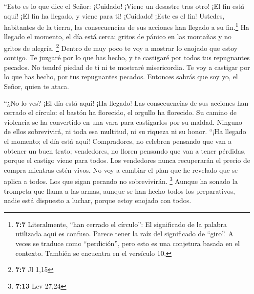  ``Esto es lo que dice el Señor: ¡Cuidado! ¡Viene un
desastre tras otro!  ¡El fin está aquí! ¡El fin ha
llegado, y viene para ti! ¡Cuidado! ¡Este es el fin! 
Ustedes, habitantes de la tierra, las consecuencias de sus acciones han
llegado a su fin.\footnote{\textbf{7:7} Literalmente, ``han cerrado el
  círculo'': El significado de la palabra utilizada aquí es confuso.
  Parece tener la raíz del significado de ``giro''. A veces se traduce
  como ``perdición'', pero esto es una conjetura basada en el contexto.
  También se encuentra en el versículo 10.} Ha llegado el momento, el
día está cerca: gritos de pánico en las montañas y no gritos de alegría.
\footnote{\textbf{7:7} Jl 1,15}  Dentro de muy poco te voy
a mostrar lo enojado que estoy contigo. Te juzgaré por lo que has hecho,
y te castigaré por todos tus repugnantes pecados.  No
tendré piedad de ti ni te mostraré misericordia. Te voy a castigar por
lo que has hecho, por tus repugnantes pecados. Entonces sabrás que soy
yo, el Señor, quien te ataca.

 ``¿No lo ves? ¡El día está aquí! ¡Ha llegado! Las
consecuencias de sus acciones han cerrado el círculo: el bastón ha
florecido, el orgullo ha florecido.  Su camino de
violencia se ha convertido en una vara para castigarlos por su maldad.
Ninguno de ellos sobrevivirá, ni toda esa multitud, ni su riqueza ni su
honor.  ``¡Ha llegado el momento; el día está aquí!
Compradores, no celebren pensando que van a obtener un buen trato;
vendedores, no lloren pensando que van a tener pérdidas, porque el
castigo viene para todos.  Los vendedores nunca
recuperarán el precio de compra mientras estén vivos. No voy a cambiar
el plan que he revelado que se aplica a todos. Los que sigan pecando no
sobrevivirán. \footnote{\textbf{7:13} Lev 27,24}  Aunque
ha sonado la trompeta que llama a las armas, aunque se han hecho todos
los preparativos, nadie está dispuesto a luchar, porque estoy enojado
con todos.

